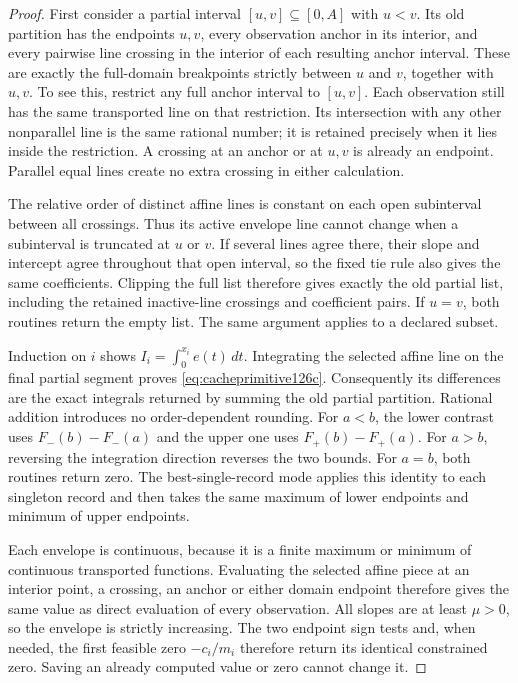 \begin{proof}
First consider a partial interval $[u,v]\subseteq[0,A]$ with $u<v$.
Its old partition has the endpoints $u,v$, every observation anchor in its
interior, and every pairwise line crossing in the interior of each resulting
anchor interval.  These are exactly the full-domain breakpoints strictly
between $u$ and $v$, together with $u,v$.  To see this, restrict any full
anchor interval to $[u,v]$.  Each observation still has the same transported
line on that restriction.  Its intersection with any other nonparallel line
is the same rational number; it is retained precisely when it lies inside
the restriction.  A crossing at an anchor or at $u,v$ is already an endpoint.
Parallel equal lines create no extra crossing in either calculation.

The relative order of distinct affine lines is constant on each open
subinterval between all crossings.  Thus its active envelope line cannot
change when a subinterval is truncated at $u$ or $v$.  If several lines
agree there, their slope and intercept agree throughout that open interval,
so the fixed tie rule also gives the same coefficients.  Clipping the full
list therefore gives exactly the old partial list, including the retained
inactive-line crossings and coefficient pairs.  If $u=v$, both routines
return the empty list.  The same argument applies to a declared subset.

Induction on $i$ shows $I_i=\int_0^{x_i}e(t)\,dt$.  Integrating the
selected affine line on the final partial segment proves
\eqref{eq:cacheprimitive126c}.  Consequently its differences are the exact
integrals returned by summing the old partial partition.  Rational addition
introduces no order-dependent rounding.  For $a<b$, the lower contrast uses
$F_-(b)-F_-(a)$ and the upper one uses $F_+(b)-F_+(a)$.  For $a>b$,
reversing the integration direction reverses the two bounds.  For $a=b$,
both routines return zero.  The best-single-record mode applies this identity
to each singleton record and then takes the same maximum of lower endpoints
and minimum of upper endpoints.

Each envelope is continuous, because it is a finite maximum or minimum of
continuous transported functions.  Evaluating the selected affine piece at
an interior point, a crossing, an anchor or either domain endpoint therefore
gives the same value as direct evaluation of every observation.  All slopes
are at least $\mu>0$, so the envelope is strictly increasing.  The two
endpoint sign tests and, when needed, the first feasible zero $-c_i/m_i$
therefore return its identical constrained zero.  Saving an already computed
value or zero cannot change it.


\end{proof}
